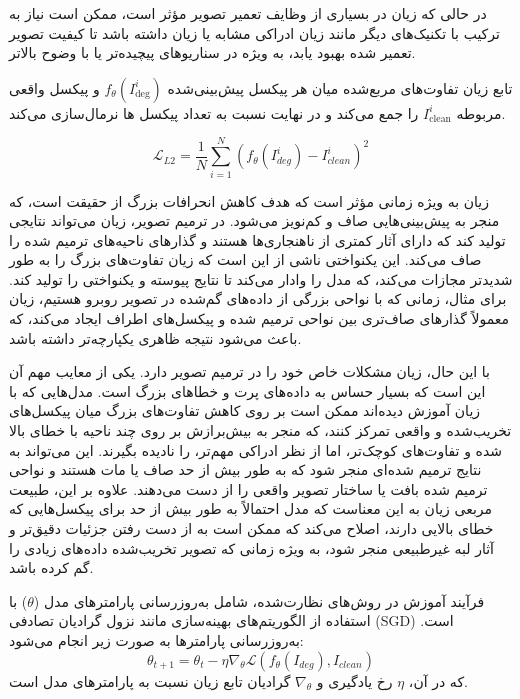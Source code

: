 در حالی که زیان  در بسیاری از وظایف تعمیر تصویر مؤثر است، ممکن است نیاز به ترکیب با تکنیک‌های دیگر مانند زیان ادراکی
مشابه 
\cite{johnsonPerceptualLossesRealTime2016}
 یا زیان  داشته باشد تا کیفیت تصویر تعمیر شده بهبود یابد، به ویژه در سناریوهای پیچیده‌تر یا با وضوح بالاتر.
 
تابع زیان  تفاوت‌های مربع‌شده میان هر پیکسل پیش‌بینی‌شده $f_{\theta}(I_{\text{deg}}^i)$ و پیکسل واقعی مربوطه $I_{\text{clean}}^i$ را جمع می‌کند و در نهایت نسبت به تعداد پیکسل ها نرمال‌سازی می‌کند. 
 
$$
\mathcal{L}_{L2} = \frac{1}{N} \sum_{i=1}^{N} (f_{\theta}(I_{deg}^i) - I_{clean}^i)^2
$$ 
 
 زیان  به ویژه زمانی مؤثر است که هدف کاهش انحرافات بزرگ از حقیقت است، که منجر به پیش‌بینی‌هایی صاف و کم‌نویز می‌شود. در ترمیم تصویر، زیان  می‌تواند نتایجی تولید کند که دارای آثار کمتری از ناهنجاری‌ها هستند و گذارهای ناحیه‌های ترمیم شده را صاف می‌کند. این یکنواختی ناشی از این است که زیان  تفاوت‌های بزرگ را به طور شدیدتر مجازات می‌کند، که مدل را وادار می‌کند تا نتایج پیوسته و یکنواختی را تولید کند. برای مثال، زمانی که با نواحی بزرگی از داده‌های گم‌شده در تصویر روبرو هستیم، زیان  معمولاً گذارهای صاف‌تری بین نواحی ترمیم شده و پیکسل‌های اطراف ایجاد می‌کند، که باعث می‌شود نتیجه ظاهری یکپارچه‌تر داشته باشد.
 
 با این حال، زیان  مشکلات خاص خود را در ترمیم تصویر دارد. یکی از معایب مهم آن این است که بسیار حساس به داده‌های پرت و خطاهای بزرگ است. مدل‌هایی که با زیان  آموزش دیده‌اند ممکن است بر روی کاهش تفاوت‌های بزرگ میان پیکسل‌های تخریب‌شده و واقعی تمرکز کنند، که منجر به بیش‌برازش
بر روی چند ناحیه با خطای بالا شده و تفاوت‌های کوچک‌تر، اما از نظر ادراکی مهم‌تر، را نادیده بگیرند. این می‌تواند به نتایج ترمیم شده‌ای منجر شود که به طور بیش از حد صاف یا مات هستند و نواحی ترمیم شده بافت یا ساختار تصویر واقعی را از دست می‌دهند. علاوه بر این، طبیعت مربعی زیان  به این معناست که مدل احتمالاً به طور بیش از حد برای پیکسل‌هایی که خطای بالایی دارند، اصلاح می‌کند که ممکن است به از دست رفتن جزئیات دقیق‌تر و آثار لبه غیرطبیعی منجر شود، به ویژه زمانی که تصویر تخریب‌شده داده‌های زیادی را گم کرده باشد.
 

فرآیند آموزش در روش‌های نظارت‌شده، شامل به‌روزرسانی پارامترهای مدل (\(\theta\)) با استفاده از الگوریتم‌های بهینه‌سازی مانند نزول گرادیان تصادفی (SGD) است. به‌روزرسانی پارامترها به صورت زیر انجام می‌شود:  
$$
\theta_{t+1} = \theta_t - \eta \nabla_{\theta} \mathcal{L}(f_{\theta}(I_{deg}), I_{clean})
$$
که در آن، $\eta$ رخ یادگیری و 
$ \nabla_{\theta} $
گرادیان تابع زیان نسبت به پارامترهای مدل است.  

